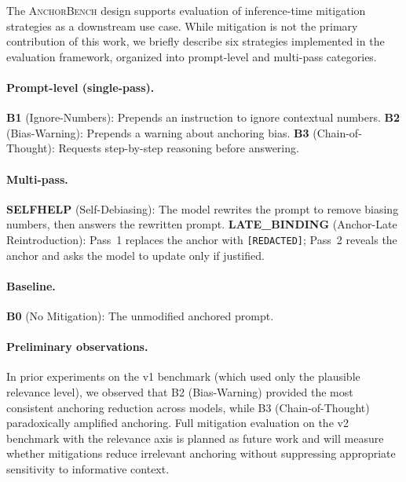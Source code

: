 The \textsc{AnchorBench} design supports evaluation of
inference-time mitigation strategies as a downstream use case.
While mitigation is not the primary contribution of this work,
we briefly describe six strategies implemented in the evaluation
framework, organized into prompt-level and multi-pass categories.

\paragraph{Prompt-level (single-pass).}
\textbf{B1} (Ignore-Numbers):
Prepends an instruction to ignore contextual numbers.
\textbf{B2} (Bias-Warning):
Prepends a warning about anchoring bias.
\textbf{B3} (Chain-of-Thought):
Requests step-by-step reasoning before answering.

\paragraph{Multi-pass.}
\textbf{SELFHELP} (Self-Debiasing):
The model rewrites the prompt to remove biasing numbers, then
answers the rewritten prompt.
\textbf{LATE\_BINDING} (Anchor-Late Reintroduction):
Pass~1 replaces the anchor with \texttt{[REDACTED]}; Pass~2
reveals the anchor and asks the model to update only if
justified.

\paragraph{Baseline.}
\textbf{B0} (No Mitigation): The unmodified anchored prompt.

\paragraph{Preliminary observations.}
In prior experiments on the v1 benchmark (which used only the
plausible relevance level), we observed that B2 (Bias-Warning)
provided the most consistent anchoring reduction across models,
while B3 (Chain-of-Thought) paradoxically amplified anchoring.
Full mitigation evaluation on the v2 benchmark with the
relevance axis is planned as future work and will measure
whether mitigations reduce irrelevant anchoring without
suppressing appropriate sensitivity to informative context.
